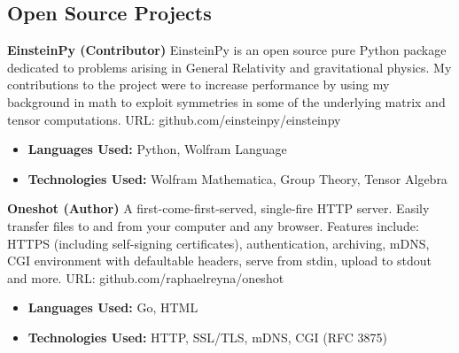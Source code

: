 \documentclass[margin]{./res}
\begin{document}
  

\address{Email: raphaelreyna@protonmail.com \\
  Phone: (626) 384-1342 \\
  Site: www.raphaelreyna.works}
                           
                        
\begin{resume} 
\section{Open Source Projects}
{\bf EinsteinPy (Contributor)}\newline
EinsteinPy is an open source pure Python package dedicated to problems arising in General Relativity and gravitational physics.
My contributions to the project were to increase performance by using my background in math to exploit symmetries in some of the underlying matrix and tensor computations.
URL: github.com/einsteinpy/einsteinpy
\begin{multicols}{2}
\begin{itemize}
\item {\bf Languages Used: }\newline Python, Wolfram Language
  \columnbreak
\item {\bf Technologies Used: }\newline Wolfram Mathematica, Group Theory, Tensor Algebra
\end{itemize}
\end{multicols}

{\bf Oneshot (Author)}\newline
A first-come-first-served, single-fire HTTP server. Easily transfer files to and from your computer and any browser.
Features include: HTTPS (including self-signing certificates), authentication, archiving, mDNS, CGI environment with defaultable headers, serve from stdin, upload to stdout and more.
URL: github.com/raphaelreyna/oneshot
\begin{multicols}{2}
\begin{itemize}
\item {\bf Languages Used: }\newline Go, HTML
  \columnbreak
\item {\bf Technologies Used: }\newline HTTP, SSL/TLS, mDNS, CGI (RFC 3875)
\end{itemize}
\end{multicols}


\end{resume}
\end{document}
